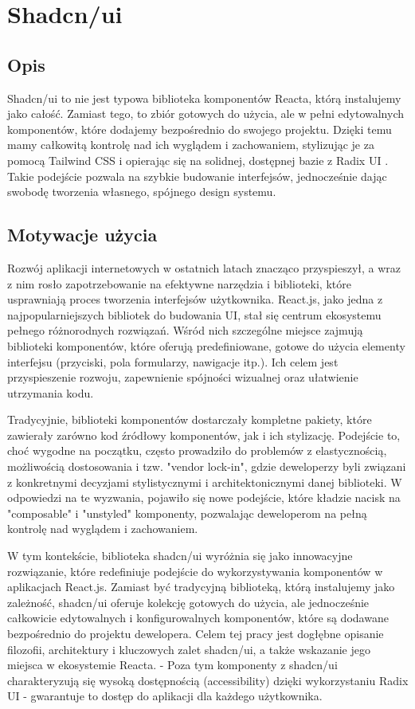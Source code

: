 \documentclass[shortabstract,inz]{iithesis}
\begin{document}
\section{Shadcn/ui}
\subsection{Opis}
Shadcn/ui \cite{bib:shadcn} to nie jest typowa biblioteka komponentów Reacta, którą instalujemy jako całość. Zamiast tego, to zbiór gotowych do użycia, ale w pełni edytowalnych komponentów, które dodajemy bezpośrednio do swojego projektu. Dzięki temu mamy całkowitą kontrolę nad ich wyglądem i zachowaniem, stylizując je za pomocą Tailwind CSS \cite{bib:tailwind} i opierając się na solidnej, dostępnej bazie z Radix UI \cite{bib:radix-ui}. Takie podejście pozwala na szybkie budowanie interfejsów, jednocześnie dając swobodę tworzenia własnego, spójnego design systemu.



\subsection{Motywacje użycia}
Rozwój aplikacji internetowych w ostatnich latach znacząco przyspieszył, a wraz z nim rosło zapotrzebowanie na efektywne narzędzia i biblioteki, które usprawniają proces tworzenia interfejsów użytkownika. React.js, jako jedna z najpopularniejszych bibliotek do budowania UI, stał się centrum ekosystemu pełnego różnorodnych rozwiązań. Wśród nich szczególne miejsce zajmują biblioteki komponentów, które oferują predefiniowane, gotowe do użycia elementy interfejsu (przyciski, pola formularzy, nawigacje itp.). Ich celem jest przyspieszenie rozwoju, zapewnienie spójności wizualnej oraz ułatwienie utrzymania kodu.

Tradycyjnie, biblioteki komponentów dostarczały kompletne pakiety, które zawierały zarówno kod źródłowy komponentów, jak i ich stylizację. Podejście to, choć wygodne na początku, często prowadziło do problemów z elastycznością, możliwością dostosowania i tzw. "vendor lock-in", gdzie deweloperzy byli związani z konkretnymi decyzjami stylistycznymi i architektonicznymi danej biblioteki. W odpowiedzi na te wyzwania, pojawiło się nowe podejście, które kładzie nacisk na "composable" i "unstyled" komponenty, pozwalając deweloperom na pełną kontrolę nad wyglądem i zachowaniem.

W tym kontekście, biblioteka shadcn/ui wyróżnia się jako innowacyjne rozwiązanie, które redefiniuje podejście do wykorzystywania komponentów w aplikacjach React.js. Zamiast być tradycyjną biblioteką, którą instalujemy jako zależność, shadcn/ui oferuje kolekcję gotowych do użycia, ale jednocześnie całkowicie edytowalnych i konfigurowalnych komponentów, które są dodawane bezpośrednio do projektu dewelopera. Celem tej pracy jest dogłębne opisanie filozofii, architektury i kluczowych zalet shadcn/ui, a także wskazanie jego miejsca w ekosystemie Reacta.
-
Poza tym komponenty z shadcn/ui charakteryzują się wysoką dostępnością (accessibility) dzięki wykorzystaniu Radix UI - gwarantuje to dostęp do aplikacji dla każdego użytkownika.
\end{document}
